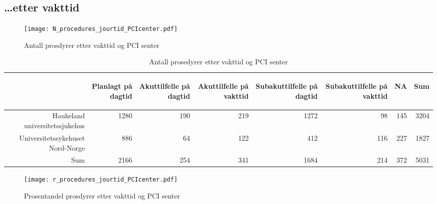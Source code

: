 \documentclass[norsk, a4paper]{report}
\begin{document}
\clearpage
\subsection{\ldots etter vakttid}



\begin{figure}[ht]
  \centering
\texttt{[image: N\_procedures\_jourtid\_PCIcenter.pdf]}  \caption{Antall prosdyrer etter vakttid og PCI senter}
\end{figure}

\begin{tiny}
\begin{table}[ht]
\centering
\begin{tabular}{rrrrrrrr}
  \toprule
 & \begin{sideways} Planlagt på dagtid \end{sideways} & \begin{sideways} Akuttilfelle på dagtid \end{sideways} & \begin{sideways} Akuttilfelle på vakttid \end{sideways} & \begin{sideways} Subakuttilfelle på dagtid \end{sideways} & \begin{sideways} Subakuttilfelle på vakttid \end{sideways} & \begin{sideways} NA \end{sideways} & \begin{sideways} Sum \end{sideways} \\ 
  \midrule
Haukeland universitetssjukehus & 1280 & 190 & 219 & 1272 & 98 & 145 & 3204 \\ 
  Universitetssykehuset Nord-Norge & 886 & 64 & 122 & 412 & 116 & 227 & 1827 \\ 
  Sum & 2166 & 254 & 341 & 1684 & 214 & 372 & 5031 \\ 
   \bottomrule
\end{tabular}
\caption{Antall prosedyrer etter vakttid og PCI senter} 
\end{table}\end{tiny}

\clearpage


\begin{figure}[ht]
  \centering
\texttt{[image: r\_procedures\_jourtid\_PCIcenter.pdf]}  \caption{Prosentandel prosdyrer etter vakttid og PCI senter}
\end{figure}
\end{document}
